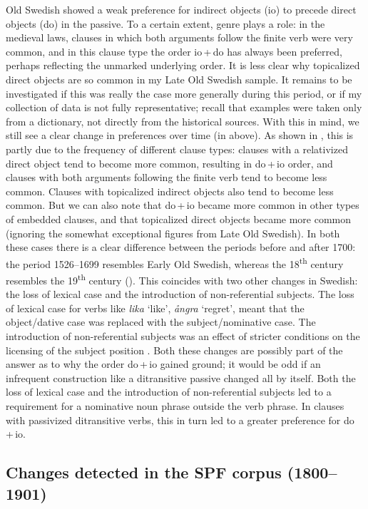 \documentclass[output=paper]{langscibook}
\begin{document}
Old Swedish showed a weak preference for indirect objects (io) to precede direct objects (do) in the passive. To a certain extent, genre plays a role: in the medieval laws, clauses in which both arguments follow the finite verb were very common, and in this clause type the order io\,+\,do has always been preferred, perhaps reflecting the unmarked underlying order. It is less clear why topicalized direct objects are so common in my Late Old Swedish sample. It remains to be investigated if this was really the case more generally during this period, or if my collection of data is not fully representative; recall that examples were taken only from a dictionary, not directly from the historical sources. With this in mind, we still see a clear change in preferences over time (in  above). As shown in , this is partly due to the frequency of different clause types: clauses with a relativized direct object tend to become more common, resulting in do\,+\,io order, and clauses with both arguments following the finite verb tend to become less common. Clauses with topicalized indirect objects also tend to become less common. But we can also note that do\,+\,io became more common in other types of embedded clauses, and that topicalized direct objects became more common (ignoring the somewhat exceptional figures from Late Old Swedish). In both these cases there is a clear difference between the periods before and after 1700: the period 1526–1699 resembles Early Old Swedish, whereas the 18\textsuperscript{th} century resembles the 19\textsuperscript{th} century (). This coincides with two other changes in Swedish: the loss of lexical case and the introduction of non-referential subjects. The loss of lexical case for verbs like \textit{lika} ‘like’, \textit{ångra} ‘regret’, meant that the object/dative case was replaced with the subject/nominative case. The introduction of non-referential subjects was an effect of stricter conditions on the licensing of the subject position \citep{Falk1993}. Both these changes are possibly part of the answer as to why the order do\,+\,io gained ground; it would be odd if an infrequent construction like a ditransitive passive changed all by itself. Both the loss of lexical case and the introduction of non-referential subjects led to a requirement for a nominative noun phrase outside the verb phrase. In clauses with passivized ditransitive verbs, this in turn led to a greater preference for do\,+\,io.

\subsection{Changes detected in the SPF corpus (1800–1901)}\label{sec:falk:5.2}
\end{document}
